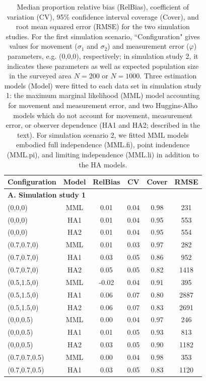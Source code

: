 \documentclass[aoas,preprint]{imsart}
\numberwithin{equation}{section}
\theoremstyle{plain}
\begin{document}
\begin{table}[ht]
\caption{Median proportion relative bias (RelBias), coefficient of variation (CV), 95\% confidence interval coverage (Cover), and root mean squared error (RMSE) for the two simulation studies. For the first simulation scenario, ``Configuration" gives values for movement ($\sigma_1$ and $\sigma_2$) and measurement error ($\varphi$) parameters, e.g. (0,0,0), respectively; in simulation study 2, it indicates these parameters as well as expected population size in the surveyed area $N=200$ or $N=1000$.  Three estimation models (Model) were fitted to each data set in simulation study 1: the maximum marginal likelihood (MML) model accounting for movement and measurement error, and two Huggins-Alho models which do not account for movement, measurement error, or observer dependence (HA1 and HA2; described in the text).  For simulation scenario 2, we fitted MML models embodied full independence (MML.fi), point indendence (MML.pi), and limiting independence (MML.li) in addition to the HA models.
}
\label{tab:sims}
\raggedright
\begin{tabular}{lccccc}
  \hline
   Configuration & Model & RelBias & CV & Cover & RMSE \\
  \hline
   \multicolumn{6}{l}{\textbf{A. Simulation study 1}}   \\
  \hline
  (0,0,0) & MML & 0.01 & 0.04 & 0.98 & 231 \\
  (0,0,0) & HA1 & 0.01 & 0.04 & 0.95 & 553 \\
  (0,0,0) & HA2 & 0.01 & 0.04 & 0.95 & 554 \\
  (0.7,0.7,0) & MML & 0.01 & 0.03 & 0.97 & 282 \\
  (0.7,0.7,0) & HA1 & 0.03 & 0.05 & 0.86 & 952 \\
  (0.7,0.7,0) & HA2 & 0.05 & 0.05 & 0.82 & 1418 \\
  (0.5,1.5,0) & MML & -0.02 & 0.04 & 0.91 & 395 \\
  (0.5,1.5,0) & HA1 & 0.06 & 0.07 & 0.80 & 2887\\
  (0.5,1.5,0) & HA2 & 0.06 & 0.07 & 0.83 & 2691 \\
  (0,0,0.5) & MML & 0.00 & 0.04 & 0.97 & 246 \\
  (0,0,0.5) & HA1 & 0.01 & 0.05 & 0.93 & 813 \\
  (0,0,0.5) & HA2 & 0.03 & 0.05 & 0.90 & 1182 \\
  (0.7,0.7,0.5) & MML & 0.00 & 0.04 & 0.98 & 353 \\
  (0.7,0.7,0.5) & HA1 & 0.03 & 0.05 & 0.83 & 1120 \\

\end{tabular}
\end{table}
\end{document}
